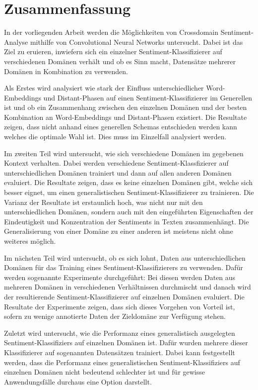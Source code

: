 \chapter*{Zusammenfassung}

In der vorliegenden Arbeit werden die Möglichkeiten von Crossdomain Sentiment-Analyse mithilfe von Convolutional Neural Networks untersucht. Dabei ist das Ziel zu eruieren, inwiefern sich ein einzelner Sentiment-Klassifizierer auf verschiedenen Domänen verhält und ob es Sinn macht, Datensätze mehrerer Domänen in Kombination zu verwenden.

Als Erstes wird analysiert wie stark der Einfluss unterschiedlicher Word-Embeddings und Distant-Phasen auf einen Sentiment-Klassifizierer im Generellen ist und ob ein Zusammenhang zwischen den einzelnen Domänen und der besten Kombination an Word-Embeddings und Distant-Phasen existiert. Die Resultate zeigen, dass nicht anhand eines generellen Schemas entschieden werden kann welches die optimale Wahl ist. Dies muss im Einzelfall analysiert werden.

Im zweiten Teil wird untersucht, wie sich verschiedene Domänen im gegebenen Kontext verhalten. Dabei werden verschiedene Sentiment-Klassfizierer auf unterschiedlichen Domänen trainiert und dann auf allen anderen Domänen evaluiert. Die Resultate zeigen, dass es keine einzelnen Domänen gibt, welche sich besser eignet, um einen generalistischen Sentiment-Klassifizierer zu trainieren. Die Varianz der Resultate ist erstaunlich hoch, was nicht nur mit den unterschiedlichen Domänen, sondern auch mit den eingeführten Eigenschaften der Eindeutigkeit und Konzentration der Sentiments in Texten zusammenhängt. Die Generalisierung von einer Domäne zu einer anderen ist meistens nicht ohne weiteres möglich.

Im nächsten Teil wird untersucht, ob es sich lohnt, Daten aus unterschiedlichen Domänen für das Training eines Sentiment-Klassifizierers zu verwenden. Dafür werden sogenannte  Experimente durchgeführt: Bei diesen werden Daten aus mehreren Domänen in verschiedenen Verhältnissen durchmischt und danach wird der resultierende Sentiment-Klassifizierer auf einzelnen Domänen evaluiert. Die Resultate der Experimente zeigen, dass sich dieses Vorgehen von Vorteil ist, sofern zu wenige annotierte Daten der Zieldomäne zur Verfügung stehen.

Zuletzt wird untersucht, wie die Performanz eines generalistisch ausgelegten Sentiment-Klassifiziers auf einzelnen Domänen ist. Dafür wurden mehrere dieser Klassifizierer auf sogenannten  Datensätzen trainiert. Dabei kann festgestellt werden, dass die Performanz eines generalistischen Sentiment-Klassifiziers auf einzelnen Domänen nicht bedeutend schlechter ist und für gewisse Anwendungsfälle durchaus eine Option darstellt.


